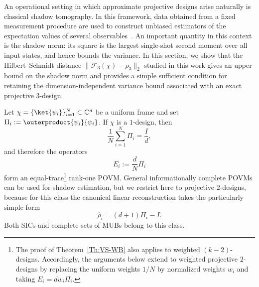 \documentclass[aps,twocolumn,pra,superscriptaddress,nofootinbib]{revtex4-2}
\begin{document}
{An operational setting in which approximate projective designs arise naturally is classical shadow tomography. In this framework, data obtained from a fixed measurement procedure are used to construct unbiased estimators of the expectation values of several observables~\cite{Huang2020Predicting,Innocenti2023}. An important quantity in this context is the shadow norm: its square is the largest single-shot second moment over all input states, and hence bounds the variance. In this section, we show that the Hilbert--Schmidt distance
$\|\mathcal{F}_{3}(\chi)-\rho_{3}\|_{2}$ studied in this work gives an upper bound on the shadow norm and provides a simple sufficient condition for retaining the dimension-independent variance bound associated with an exact projective $3$-design.

Let $\chi=\{\ket{\psi_i}\}_{i=1}^{N}\subset\mathbb{C}^{d}$ be a uniform frame and set
$\Pi_i:=\outerproduct{\psi_i}{\psi_i}$. If $\chi$ is a $1$-design, then
\begin{equation}
    \frac{1}{N}\sum_{i=1}^{N}\Pi_i=\frac{I}{d},
\end{equation}
and therefore the operators
\begin{equation}
    E_i:=\frac{d}{N}\Pi_i
\end{equation}
form an equal-trace\footnote{The proof of Theorem~\ref{Th:VS-WB} also applies to weighted $(k-2)$-designs. Accordingly, the arguments below extend to weighted projective $2$-designs by replacing the uniform weights $1/N$ by normalized weights $w_i$ and taking $E_i=dw_i\Pi_i$.} rank-one POVM. General informationally complete POVMs can be used for shadow estimation, but we restrict here to projective $2$-designs, because for this class the canonical linear reconstruction takes the particularly simple form~\cite{Scott2006TightIC,Innocenti2023}
\begin{equation}
    \widehat{\rho}_i=(d+1)\Pi_i-I.
    \label{eq:shadow-reconstruction}
\end{equation}
Both SICs and complete sets of MUBs belong to this class.

}
\end{document}
